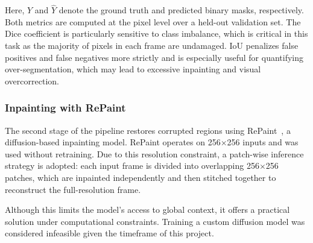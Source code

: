 \documentclass[10pt,a4paper,twocolumn,twoside]{article}
\begin{document}
Here, $Y$ and $\hat{Y}$ denote the ground truth and predicted binary masks, respectively. Both metrics are computed at the pixel level over a held-out validation set. The Dice coefficient is particularly sensitive to class imbalance, which is critical in this task as the majority of pixels in each frame are undamaged. IoU penalizes false positives and false negatives more strictly and is especially useful for quantifying over-segmentation, which may lead to excessive inpainting and visual overcorrection.

\subsubsection{Inpainting with RePaint}

The second stage of the pipeline restores corrupted regions using RePaint~\cite{repaint}, a diffusion-based inpainting model. RePaint operates on 256$\times$256 inputs and was used without retraining. Due to this resolution constraint, a patch-wise inference strategy is adopted: each input frame is divided into overlapping 256$\times$256 patches, which are inpainted independently and then stitched together to reconstruct the full-resolution frame.

Although this limits the model’s access to global context, it offers a practical solution under computational constraints. Training a custom diffusion model was considered infeasible given the timeframe of this project.
\end{document}
